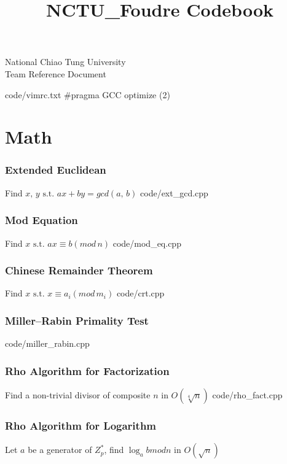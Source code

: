\documentclass [landscape,8pt,a4paper,twocolumn]{article}
\title {NCTU\_Foudre Codebook}
\begin{document}
\thispagestyle{fancy}
{ \Huge National Chiao Tung University \\ Team Reference Document}
\tableofcontents

\newpage
 {code/vimrc.txt}
\#pragma GCC optimize (2)

\newpage
\part{Math}

\section{Extended Euclidean}
Find $ x, \, y \text{ s.t. } ax+by=gcd(a, \, b) $
 {code/ext_gcd.cpp}

\section{Mod Equation}
Find $ x \text{ s.t. } ax \equiv b(mod \, n) $
 {code/mod_eq.cpp}

\section{Chinese Remainder Theorem}
Find $ x \text{ s.t. } x \equiv a_i(mod \, m_i) $
 {code/crt.cpp}

\section{Miller–Rabin Primality Test}
 {code/miller_rabin.cpp}

\section{Rho Algorithm for Factorization}
Find a non-trivial divisor of composite $ n $ in $ O(\sqrt[4]{n}) $
 {code/rho_fact.cpp}

\section{Rho Algorithm for Logarithm}
Let $ a $ be a generator of $ Z_{p}^{*} $, find $ \log_{a}{b} mod n $ in $ O(\sqrt{n}) $
\end{document}
